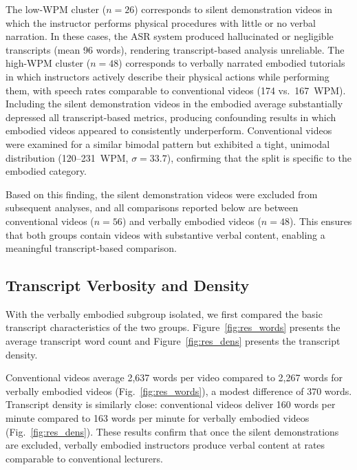 The low-WPM cluster ($n = 26$) corresponds to silent demonstration videos in which the instructor performs physical procedures with little or no verbal narration. In these cases, the ASR system produced hallucinated or negligible transcripts (mean 96 words), rendering transcript-based analysis unreliable. The high-WPM cluster ($n = 48$) corresponds to verbally narrated embodied tutorials in which instructors actively describe their physical actions while performing them, with speech rates comparable to conventional videos (174 vs.\ 167~WPM). Including the silent demonstration videos in the embodied average substantially depressed all transcript-based metrics, producing confounding results in which embodied videos appeared to consistently underperform. Conventional videos were examined for a similar bimodal pattern but exhibited a tight, unimodal distribution (120--231~WPM, $\sigma = 33.7$), confirming that the split is specific to the embodied category.

Based on this finding, the silent demonstration videos were excluded from subsequent analyses, and all comparisons reported below are between conventional videos ($n = 56$) and verbally embodied videos ($n = 48$). This ensures that both groups contain videos with substantive verbal content, enabling a meaningful transcript-based comparison.


\subsection{Transcript Verbosity and Density}

With the verbally embodied subgroup isolated, we first compared the basic transcript characteristics of the two groups. Figure~\ref{fig:res_words} presents the average transcript word count and Figure~\ref{fig:res_dens} presents the transcript density.

Conventional videos average 2{,}637 words per video compared to 2{,}267 words for verbally embodied videos (Fig.~\ref{fig:res_words}), a modest difference of 370 words. Transcript density is similarly close: conventional videos deliver 160 words per minute compared to 163 words per minute for verbally embodied videos (Fig.~\ref{fig:res_dens}). These results confirm that once the silent demonstrations are excluded, verbally embodied instructors produce verbal content at rates comparable to conventional lecturers.

